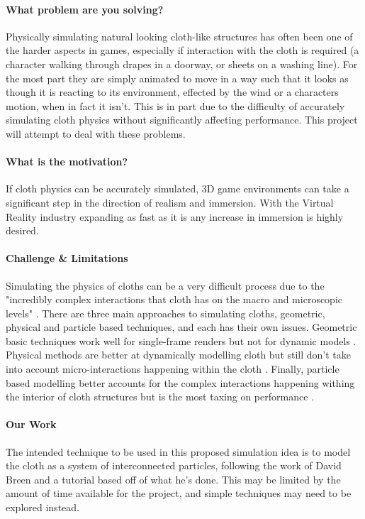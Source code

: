 \documentclass[conference,backref=page]{acmsiggraph}
\begin{document}
\paragraph{What problem are you solving?}
Physically simulating natural looking cloth-like structures has often been one of the harder aspects in games, especially if interaction with the cloth is required (a character walking through drapes in a doorway, or sheets on a washing line). For the most part they are simply animated to move in a way such that it looks as though it is reacting to its environment, effected by the wind or a characters motion, when in fact it isn't. This is in part due to the difficulty of accurately simulating cloth physics without significantly affecting performance. This project will attempt to deal with these problems.


\paragraph{What is the motivation?}
If cloth physics can be accurately simulated, 3D game environments can take a significant step in the direction of realism and immersion. With the Virtual Reality industry expanding as fast as it is any increase in immersion is highly desired.

\paragraph{Challenge \& Limitations}
Simulating the physics of cloths can be a very difficult process due to the "incredibly complex interactions that cloth has on the macro and microscopic levels" \cite{kristopher}. There are three main approaches to simulating cloths, geometric, physical and particle based techniques, and each has their own issues. Geometric basic techniques work well for single-frame renders but not for dynamic models \cite{Weil}. Physical methods are better at dynamically modelling cloth but still don't take into account micro-interactions happening within the cloth \cite{Feynman}. Finally, particle based modelling better accounts for the complex interactions happening withing the interior of cloth structures but is the most taxing on performance \cite{Breen}.

\paragraph{Our Work}
The intended technique to be used in this proposed simulation idea is to model the cloth as a system of interconnected particles, following the work of David Breen and a tutorial based off of what he's done. This may be limited by the amount of time available for the project, and simple techniques may need to be explored instead.
\end{document}
